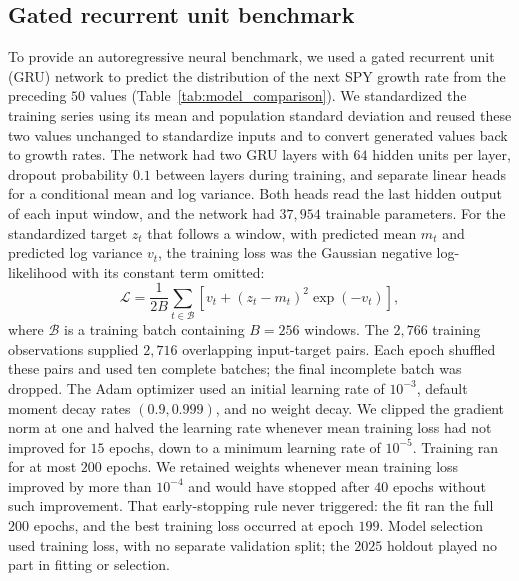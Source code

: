\subsection{Gated recurrent unit benchmark}
\label{sec:supp-gru}

To provide an autoregressive neural benchmark, we used a gated
recurrent unit (GRU) network to predict the distribution of the next
SPY growth rate from the preceding $50$ values
(Table~\ref{tab:model_comparison}). We standardized the training
series using its mean and population standard deviation and reused
these two values unchanged to standardize inputs and to convert
generated values back to growth rates. The network had two GRU layers
with $64$ hidden units per layer, dropout probability $0.1$ between
layers during training, and separate linear heads for a conditional
mean and log variance. Both heads read the last hidden output of each
input window, and the network had $37{,}954$ trainable parameters.
For the standardized target $z_t$ that follows a window, with
predicted mean $m_t$ and predicted log variance $v_t$, the training
loss was the Gaussian negative log-likelihood with its constant term
omitted:
\begin{equation}
 \mathcal L=\frac{1}{2B}\sum_{t\in\mathcal B}
       \left[v_t+(z_t-m_t)^2\exp(-v_t)\right],
 \label{eq:gru-loss}
\end{equation}
where $\mathcal B$ is a training batch containing $B=256$ windows.
The $2{,}766$ training observations supplied $2{,}716$ overlapping
input-target pairs. Each epoch shuffled these pairs and used ten
complete batches; the final incomplete batch was dropped. The Adam
optimizer used an initial learning rate of $10^{-3}$, default moment
decay rates $(0.9,0.999)$, and no weight decay. We clipped the
gradient norm at one and halved the learning rate whenever mean
training loss had not improved for $15$ epochs, down to a minimum
learning rate of $10^{-5}$. Training ran for at most $200$ epochs. We
retained weights whenever mean training loss improved by more than
$10^{-4}$ and would have stopped after $40$ epochs without such
improvement. That early-stopping rule never triggered: the fit ran
the full $200$ epochs, and the best training loss occurred at epoch
$199$. Model selection used training loss, with no separate
validation split; the $2025$ holdout played no part in fitting or
selection.

